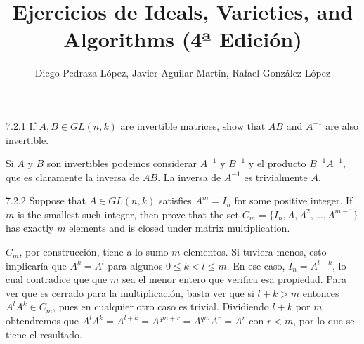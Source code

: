 \documentclass[twoside]{article}
\begin{document}
\title{Ejercicios de Ideals, Varieties, and Algorithms (4ª Edición)}
\author{Diego Pedraza López, Javier Aguilar Martín, Rafael González López}
\maketitle

\begin{ejercicio}{7.2.1}
If $A, B ∈ GL(n, k)$ are invertible matrices, show that $AB$ and $A^{−1}$ are also invertible.
\end{ejercicio}
\begin{solucion}
Si $A$ y $B$ son invertibles podemos considerar $A^{-1}$ y $B^{-1}$ y el producto $B^{-1}A^{-1}$, que es claramente la inversa de $AB$. La inversa de $A^{-1}$ es trivialmente $A$.
\end{solucion}

\newpage

\begin{ejercicio}{7.2.2}
Suppose that $A ∈ GL(n, k)$ satisfies $A^m = I_n$ for some positive integer. If $m$ is the
smallest such integer, then prove that the set $C_m = \{I_n, A, A^2,\dots , A^{m−1}\}$ has exactly $m$
elements and is closed under matrix multiplication.
\end{ejercicio}
\begin{solucion}
$C_m$, por construcción, tiene a lo sumo $m$ elementos. Si tuviera menos, esto implicaría que $A^k=A^l$ para algunos $0\leq k<l\leq m$. En ese caso, $I_n=A^{l-k}$, lo cual contradice que que $m$ sea el menor entero que verifica esa propiedad. Para ver que es cerrado para la multiplicación, basta ver que si $l+k> m$ entonces $A^lA^k\in C_m$, pues en cualquier otro caso es trivial. Dividiendo $l+k$ por $m$ obtendremos que $A^lA^k=A^{l+k}=A^{qm+r}=A^{qm}A^r=A^r$ con $r<m$, por lo que se tiene el resultado. 
\end{solucion}

\newpage
\end{document}
